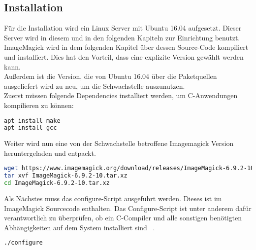 \subsection{Installation}\label{subsec:installation}

Für die Installation wird ein Linux Server mit Ubuntu 16.04 aufgesetzt.
Dieser Server wird in diesem und in den folgenden Kapiteln zur Einrichtung benutzt.\\

ImageMagick wird in dem folgenden Kapitel über dessen Source-Code kompiliert und installiert.
Dies hat den Vorteil, dass eine explizite Version gewählt werden kann.\\

Außerdem ist die Version, die von Ubuntu 16.04 über die Paketquellen ausgeliefert wird zu neu,
um die Schwachstelle auszunutzen.\\

Zuerst müssen folgende Dependencies installiert werden, um C-Anwendungen kompilieren zu können:

\begin{lstlisting}[language=Bash, caption=Imagemagick Installation: Dependencies,label={lst:installdep}]
apt install make
apt install gcc
\end{lstlisting}
\vspace{5mm}

Weiter wird nun eine von der Schwachstelle betroffene Imagemagick Version heruntergeladen und entpackt.
\begin{lstlisting}[language=Bash, caption=Imagemgaick Installation: Source Code herunterladen und entpacken,label={lst:installsource}]
wget https://www.imagemagick.org/download/releases/ImageMagick-6.9.2-10.tar.xz
tar xvf ImageMagick-6.9.2-10.tar.xz
cd ImageMagick-6.9.2-10.tar.xz
\end{lstlisting}
\vspace{5mm}

Als Nächstes muss das configure-Script ausgeführt werden.
Dieses ist im ImageMagick Sourcecode enthalten.
Das Configure-Script ist unter anderem dafür verantwortlich zu überprüfen,
ob ein C-Compiler und alle sonstigen benötigten Abhängigkeiten auf dem System installiert sind
~\cite{georgebrocklehurstMagicConfigureMake}.\\

\begin{lstlisting}[language=Bash, caption=Imagemagick Installation: Configure,label={lst:installconfigure}]
./configure

\end{lstlisting}
\vspace{5mm}

